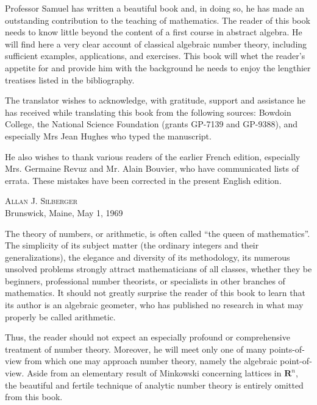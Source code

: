 Professor Samuel has written a beautiful book and, in doing so, he has made
an outstanding contribution to the teaching of mathematics. The reader of
this book needs to know little beyond the content of a first course in
abstract algebra. He will find here a very clear account of classical
algebraic number theory, including sufficient examples, applications, and
exercises. This book will whet the reader's appetite for and provide him
with the background he needs to enjoy the lengthier treatises listed in the
bibliography.

The translator wishes to acknowledge, with gratitude, support and assistance
he has received while translating this book from the following sources:
Bowdoin College, the National Science Foundation (grants GP-7139 and
GP-9388), and especially Mrs Jean Hughes who typed the manuscript.

He also wishes to thank various readers of the earlier French edition,
especially Mrs. Germaine Revuz and Mr. Alain Bouvier, who have communicated
lists of errata. These mistakes have been corrected in the present English
edition.

\vspace{1.5\baselineskip}
\begin{flushright}
\textsc{Allan J. Silberger}\\
Brunswick, Maine, May 1, 1969
\end{flushright}

\clearpage
\setcounter{page}{9}%

The theory of numbers, or arithmetic, is often called ``the queen of
mathematics''. The simplicity of its subject matter (the ordinary integers
and their generalizations), the elegance and diversity of its methodology,
its numerous unsolved problems strongly attract mathematicians of all
classes, whether they be beginners, professional number theorists, or
specialists in other branches of mathematics. It should not greatly surprise
the reader of this book to learn that its author is an algebraic geometer,
who has published no research in what may properly be called arithmetic.

Thus, the reader should not expect an especially profound or comprehensive
treatment of number theory. Moreover, he will meet only one of many
points-of-view from which one may approach number theory, namely the
algebraic point-of-view. Aside from an elementary result of Minkowski
concerning lattices in $\mathbf{R}^{n}$, the beautiful and fertile technique
of analytic number theory is entirely omitted from this book.

